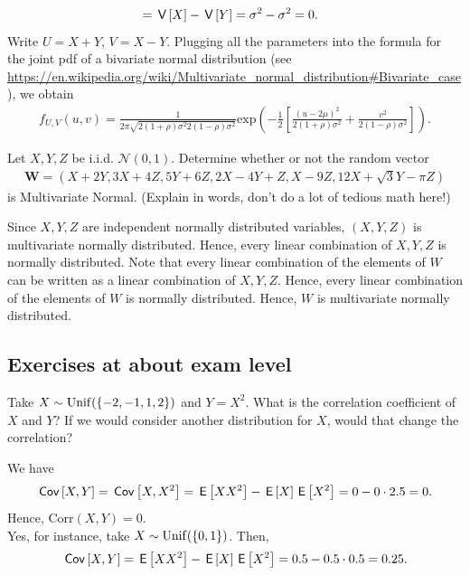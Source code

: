 \documentclass[assignments]{subfiles}
\begin{document}
\begin{exercise}
\begin{solution}
\begin{enumerate}
\begin{align}
&= \,\mathsf{V}\left[X\right] - \,\mathsf{V}\left[Y\right] = \sigma^2 - \sigma^2 = 0.
    \end{align}
    Write $U = X+Y$, $V = X - Y$. Plugging all the parameters into the formula for the joint pdf of a bivariate normal distribution (see \url{https://en.wikipedia.org/wiki/Multivariate_normal_distribution#Bivariate_case}), we obtain
    \begin{align}
        f_{U,V}(u,v) = \frac{1}{2\pi\sqrt{2(1+\rho)\sigma^2 2(1-\rho)\sigma^2} } \text{exp}\left(-\frac{1}{2}\left[\frac{(u - 2\mu)^2}{2(1+\rho)\sigma^2} + \frac{v^2}{2(1-\rho)\sigma^2} \right]\right).
    \end{align}
\end{enumerate}
\end{solution}
\end{exercise}

\begin{exercise}
Let $X, Y, Z$ be i.i.d. $\mathcal{N}(0,1).$ Determine whether or not the random vector
\begin{align*}
    \mathbf{W} = (X+2Y, 3X+4Z, 5Y+6Z, 2X-4Y+Z, X-9Z, 12X+\sqrt{3}Y -\pi Z)
\end{align*}
is Multivariate Normal. (Explain in words, don't do a lot of tedious math here!)
\begin{solution}
Since $X,Y,Z$ are independent normally distributed variables, $(X,Y,Z)$ is multivariate normally distributed. Hence, every linear combination of $X,Y,Z$ is normally distributed. Note that every linear combination of the elements of $W$ can be written as a linear combination of $X,Y,Z$. Hence, every linear combination of the elements of $W$ is normally distributed. Hence, $W$ is multivariate normally distributed.
\end{solution}
\end{exercise}


\subsection{Exercises at about exam level}





\begin{exercise}
Take $X\sim\mathrm{Unif}(\{-2, -1, 1, 2\})$ and $Y= X^2$. What is the correlation coefficient of $X$ and $Y$?
If we would consider another distribution for $X$, would that change the correlation?
\begin{solution}
We have
\begin{align}
    \,\mathsf{Cov}\left[X,Y\right] = \,\mathsf{Cov}\left[X,X^2\right] = \,\mathsf{E}\left[XX^2\right] - \,\mathsf{E}\left[X\right]\,\mathsf{E}\left[X^2\right] = 0 - 0\cdot 2.5 = 0.
\end{align}
Hence, $\text{Corr}(X,Y) = 0$. \\
Yes, for instance, take $X \sim \mathrm{Unif}(\{0,1\})$. Then,
\begin{align}
    \,\mathsf{Cov}\left[X,Y\right] = \,\mathsf{E}\left[XX^2\right] - \,\mathsf{E}\left[X\right]\,\mathsf{E}\left[X^2\right] = 0.5 - 0.5\cdot 0.5 = 0.25.
\end{align}
\end{solution}
\end{exercise}
\end{document}
